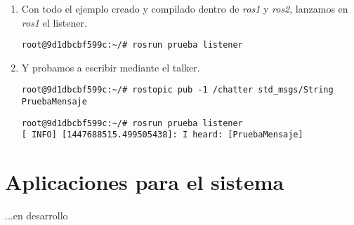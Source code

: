 \begin{enumerate}
\begin{enumerate}
			\item Con todo el ejemplo creado y compilado dentro de \emph{ros1} y \emph{ros2}, lanzamos en \emph{ros1} el listener.
			\begin{lstlisting}[style=consola]
root@9d1dbcbf599c:~/# rosrun prueba listener	
			\end{lstlisting}
			
			\item Y probamos a escribir mediante el talker.
			\begin{lstlisting}[style=consola]
root@9d1dbcbf599c:~/# rostopic pub -1 /chatter std_msgs/String PruebaMensaje
			\end{lstlisting}
			\begin{lstlisting}[style=consola]
root@9d1dbcbf599c:~/# rosrun prueba listener
[ INFO] [1447688515.499505438]: I heard: [PruebaMensaje]
			\end{lstlisting}

		\end{enumerate}
		
	\end{enumerate}
	
	\section{Aplicaciones para el sistema}
		{\color{red} ...en desarrollo}